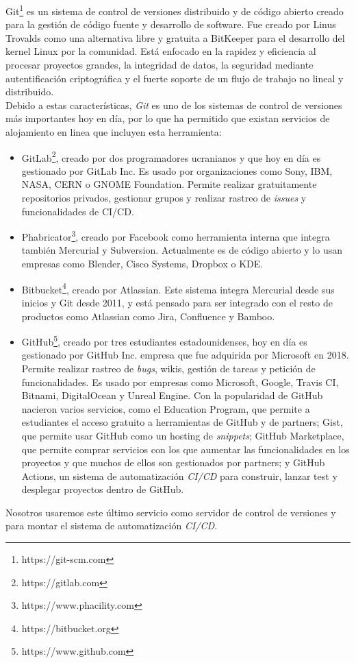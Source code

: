 Git\footnote{https://git-scm.com} es un sistema de control de versiones distribuido y de código abierto creado para la gestión de código fuente y desarrollo de software. Fue creado por Linus Trovalds como una alternativa libre y gratuita a BitKeeper para el desarrollo del kernel Linux por la comunidad. Está enfocado en la rapidez y eficiencia al procesar proyectos grandes, la integridad de datos, la seguridad mediante autentificación criptográfica y el fuerte soporte de un flujo de trabajo no lineal y distribuido. \\

Debido a estas características, \textit{Git} es uno de los sistemas de control de versiones más importantes hoy en día, por lo que ha permitido que existan servicios de alojamiento en linea que incluyen esta herramienta:

\begin{itemize}
	\item GitLab\footnote{https://gitlab.com}, creado por dos programadores ucranianos y que hoy en día es gestionado por GitLab Inc. Es usado por organizaciones como Sony, IBM, NASA, CERN o GNOME Foundation. Permite realizar gratuitamente repositorios privados, gestionar grupos y realizar rastreo de \textit{issues} y funcionalidades de CI/CD.
	\item Phabricator\footnote{https://www.phacility.com}, creado por Facebook como herramienta interna que integra también Mercurial y Subversion. Actualmente es de código abierto y lo usan empresas como Blender, Cisco Systems, Dropbox o KDE.
	\item Bitbucket\footnote{https://bitbucket.org}, creado por Atlassian. Este sistema integra Mercurial desde sus inicios y Git desde 2011, y está pensado para ser integrado con el resto de productos como Atlassian como Jira, Confluence y Bamboo.
	\item GitHub\footnote{https://www.github.com}, creado por tres estudiantes estadounidenses, hoy en día es gestionado por GitHub Inc. empresa que fue adquirida por Microsoft en 2018. Permite realizar rastreo de \textit{bugs}, wikis, gestión de tareas y petición de funcionalidades. Es usado por empresas como Microsoft, Google, Travis CI, Bitnami, DigitalOcean y Unreal Engine. Con la popularidad de GitHub nacieron varios servicios, como el Education Program, que permite a estudiantes el acceso gratuito a herramientas de GitHub y de partners; Gist, que permite usar GitHub como un hosting de \textit{snippets}; GitHub Marketplace, que permite comprar servicios con los que aumentar las funcionalidades en los proyectos y que muchos de ellos son gestionados por partners; y GitHub Actions, un sistema de automatización \textit{CI/CD} para construir, lanzar test y desplegar proyectos dentro de GitHub.
\end{itemize}

Nosotros usaremos este último servicio como servidor de control de versiones y para montar el sistema de automatización \textit{CI/CD}.
